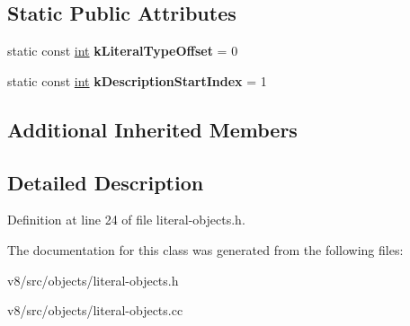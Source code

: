 \subsection*{Static Public Attributes}
\begin{DoxyCompactItemize}
\item 
\mbox{\label{classv8_1_1internal_1_1ObjectBoilerplateDescription_a2fe1de7b03bea2457dce1df29a70e780}} 
static const \mbox{\hyperlink{classint}{int}} {\bfseries k\+Literal\+Type\+Offset} = 0
\item 
\mbox{\label{classv8_1_1internal_1_1ObjectBoilerplateDescription_a693d78087391598956c3c5ae889508c2}} 
static const \mbox{\hyperlink{classint}{int}} {\bfseries k\+Description\+Start\+Index} = 1
\end{DoxyCompactItemize}
\subsection*{Additional Inherited Members}


\subsection{Detailed Description}


Definition at line 24 of file literal-\/objects.\+h.



The documentation for this class was generated from the following files\+:\begin{DoxyCompactItemize}
\item 
v8/src/objects/literal-\/objects.\+h\item 
v8/src/objects/literal-\/objects.\+cc\end{DoxyCompactItemize}
